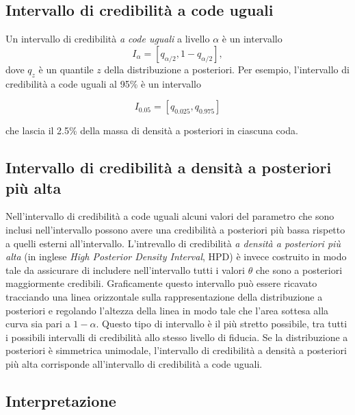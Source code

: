 \documentclass[
  11pt,
  italian,
  a4paper,
  extrafontsizes,onecolumn,openright
  ]{memoir}
\begin{document}
\hypertarget{intervallo-di-credibilituxe0-a-code-uguali}{%
\subsection{Intervallo di credibilità a code uguali}\label{intervallo-di-credibilituxe0-a-code-uguali}}

Un intervallo di credibilità \emph{a code uguali} a livello \(\alpha\) è un
intervallo \[I_{\alpha} = [q_{\alpha/2}, 1 - q_{\alpha/2}],\] dove \(q_z\) è un quantile \(z\) della distribuzione a posteriori. Per esempio,
l'intervallo di credibilità a code uguali al 95\% è un intervallo

\[
I_{0.05} = [q_{0.025}, q_{0.975}]
\]

che lascia il 2.5\% della massa di densità a posteriori in ciascuna coda.

\hypertarget{intervallo-di-credibilituxe0-a-densituxe0-a-posteriori-piuxf9-alta}{%
\subsection{Intervallo di credibilità a densità a posteriori più alta}\label{intervallo-di-credibilituxe0-a-densituxe0-a-posteriori-piuxf9-alta}}

Nell'intervallo di credibilità a code uguali alcuni valori del parametro che sono inclusi nell'intervallo possono avere una credibilità a posteriori più bassa rispetto a quelli esterni all'intervallo. L'intrevallo di credibilità \emph{a densità a posteriori più alta} (in inglese \emph{High Posterior Density Interval}, HPD) è invece costruito in modo tale da assicurare di includere nell'intervallo tutti i valori \(\theta\) che sono a posteriori maggiormente credibili. Graficamente questo intervallo può essere ricavato tracciando una linea orizzontale sulla rappresentazione della distribuzione a posteriori e regolando l'altezza della linea in modo tale che l'area sottesa alla curva sia pari a \(1 - \alpha\). Questo tipo di intervallo è il più stretto possibile, tra tutti i possibili intervalli di credibilità allo stesso livello di fiducia. Se la distribuzione a posteriori è simmetrica unimodale, l'intervallo di credibilità a densità a posteriori più alta corrisponde all'intervallo di credibilità a code uguali.

\hypertarget{interpretazione}{%
\subsection{Interpretazione}\label{interpretazione}}
\end{document}
